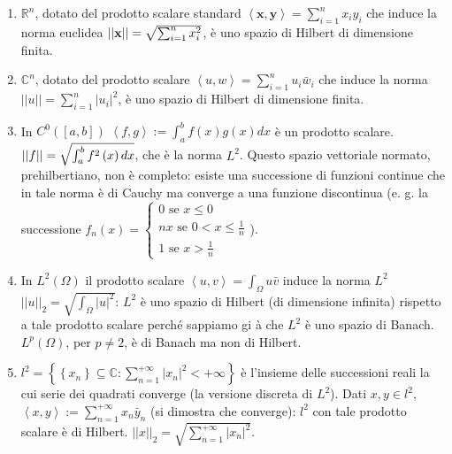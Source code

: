 \documentclass{article}
\begin{document}
\begin{enumerate}
\item $%
\mathbb{R}
^{n}$, dotato del prodotto scalare standard $\left\langle \mathbf{x,y}%
\right\rangle =\sum_{i=1}^{n}x_{i}y_{i}$ che induce la norma euclidea $%
\left\vert \left\vert \mathbf{x}\right\vert \right\vert =\sqrt{%
\sum_{i=1}^{n}x_{i}^{2}}$, \`{e} uno spazio di Hilbert di dimensione finita.

\item $%
\mathbb{C}
^{n}$, dotato del prodotto scalare $\left\langle u,w\right\rangle
=\sum_{i=1}^{n}u_{i}\bar{w}_{i}$ che induce la norma $\left\vert \left\vert
u\right\vert \right\vert =\sum_{i=1}^{n}\left\vert u_{i}\right\vert ^{2}$, 
\`{e} uno spazio di Hilbert di dimensione finita.

\item In $C^{0}\left( \left[ a,b\right] \right) $ $\left\langle
f,g\right\rangle :=\int_{a}^{b}f\left( x\right) g\left( x\right) dx$ \`{e}
un prodotto scalare. $\left\vert \left\vert f\right\vert \right\vert =\sqrt{%
\int_{a}^{b}f^{2}\left( x\right) dx}$, che \`{e} la norma $L^{2}$. Questo
spazio vettoriale normato, prehilbertiano, non \`{e} completo: esiste una
successione di funzioni continue che in tale norma \`{e} di Cauchy ma
converge a una funzione discontinua (e. g. la successione $f_{n}\left(
x\right) =\left\{ 
\begin{array}{c}
0\text{ se }x\leq 0 \\ 
nx\text{ se }0<x\leq \frac{1}{n} \\ 
1\text{ se }x>\frac{1}{n}%
\end{array}%
\right. $).

\item In $L^{2}\left( \Omega \right) $ il prodotto scalare $\left\langle
u,v\right\rangle =\int_{\Omega }u\bar{v}$ induce la norma $L^{2}$ $%
\left\vert \left\vert u\right\vert \right\vert _{2}=\sqrt{\int_{\Omega
}\left\vert u\right\vert ^{2}}$: $L^{2}$ \`{e} uno spazio di Hilbert (di
dimensione infinita) rispetto a tale prodotto scalare perch\'{e} sappiamo gi%
\`{a} che $L^{2}$ \`{e} uno spazio di Banach. $L^{p}\left( \Omega \right) $,
per $p\neq 2$, \`{e} di Banach ma non di Hilbert.

\item $l^{2}=\left\{ \left\{ x_{n}\right\} \subseteq 
\mathbb{C}
:\sum_{n=1}^{+\infty }\left\vert x_{n}\right\vert ^{2}<+\infty \right\} $ 
\`{e} l'insieme delle successioni reali la cui serie dei quadrati converge
(la versione discreta di $L^{2}$). Dati $x,y\in l^{2}$, $\left\langle
x,y\right\rangle :=\sum_{n=1}^{+\infty }x_{n}\bar{y}_{n}$ (si dimostra che
converge): $l^{2}$ con tale prodotto scalare \`{e} di Hilbert. $\left\vert
\left\vert x\right\vert \right\vert _{2}=\sqrt{\sum_{n=1}^{+\infty
}\left\vert x_{n}\right\vert ^{2}}$.
\end{enumerate}
\end{document}
